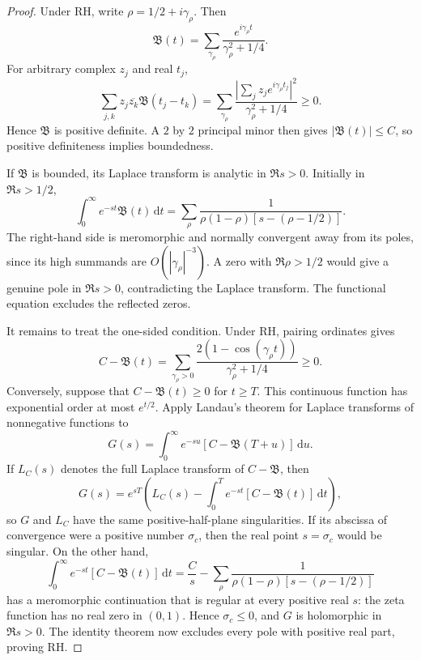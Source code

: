 \documentclass[11pt,a4paper]{article}
\numberwithin{equation}{section}
\theoremstyle{definition}
\newcommand{\dd}{\,\mathrm{d}}
\newcommand{\Bres}{\mathfrak B}
\begin{document}
\begin{proof}
Under RH, write \(\rho=1/2+i\gamma_\rho\).  Then
\[
  \Bres(t)=\sum_{\gamma_\rho}
  \frac{e^{i\gamma_\rho t}}{\gamma_\rho^2+1/4}.
\]
For arbitrary complex \(z_j\) and real \(t_j\),
\[
  \sum_{j,k}z_j\overline{z_k}\Bres(t_j-t_k)
  =\sum_{\gamma_\rho}
  \frac{\left|\sum_jz_je^{i\gamma_\rho t_j}\right|^2}
  {\gamma_\rho^2+1/4}\ge0.
\]
Hence \(\Bres\) is positive definite.  A \(2\) by \(2\) principal minor
then gives \(|\Bres(t)|\le C\), so positive definiteness implies boundedness.

If \(\Bres\) is bounded, its Laplace transform is analytic in \(\Re s>0\).
Initially in \(\Re s>1/2\),
\begin{equation}\label{eq:Bres-Laplace}
  \int_0^\infty e^{-st}\Bres(t)\dd t
  =\sum_\rho
  \frac1{\rho(1-\rho)[s-(\rho-1/2)]}.
\end{equation}
The right-hand side is meromorphic and normally convergent away from its
poles, since its high summands are \(O(|\gamma_\rho|^{-3})\).  A zero with
\(\Re\rho>1/2\) would give a genuine pole in \(\Re s>0\), contradicting the
Laplace transform.  The functional equation excludes the reflected zeros.

It remains to treat the one-sided condition.  Under RH, pairing ordinates
gives
\begin{equation}\label{eq:Pcone-RH-sum}
  C-\Bres(t)
  =\sum_{\gamma_\rho>0}
  \frac{2(1-\cos(\gamma_\rho t))}{\gamma_\rho^2+1/4}\ge0.
\end{equation}
Conversely, suppose that \(C-\Bres(t)\ge0\) for \(t\ge T\).  This continuous
function has exponential order at most \(e^{t/2}\).  Apply Landau's theorem
for Laplace transforms of nonnegative functions
\cite[Chapter~II, Theorem~5b]{widder1941} to
\[
  G(s)=\int_0^\infty e^{-su}[C-\Bres(T+u)]\dd u.
\]
If \(L_C(s)\) denotes the full Laplace transform of \(C-\Bres\), then
\[
  G(s)=e^{sT}\left(
    L_C(s)-\int_0^T e^{-st}[C-\Bres(t)]\dd t
  \right),
\]
so \(G\) and \(L_C\) have the same positive-half-plane singularities.
If its abscissa of convergence were a positive number \(\sigma_c\), then the
real point \(s=\sigma_c\) would be singular.  On the other hand,
\[
  \int_0^\infty e^{-st}[C-\Bres(t)]\dd t
  =\frac Cs-
  \sum_\rho\frac1{\rho(1-\rho)[s-(\rho-1/2)]}
\]
has a meromorphic continuation that is regular at every positive real
\(s\): the zeta function has no real zero in \((0,1)\).  Hence
\(\sigma_c\le0\), and \(G\) is holomorphic in \(\Re s>0\).  The identity
theorem now excludes every pole with positive real part, proving RH.
\end{proof}
\end{document}
